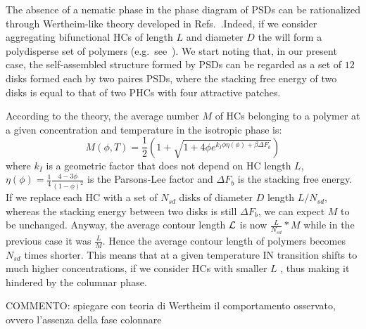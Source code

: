 \documentclass[aip,jcp, amsmath, amssymb, reprint]{revtex4-1}
\begin{document}
The absence of a nematic phase in the phase diagram of PSDs can be rationalized through Wertheim-like
theory developed in Refs.~\cite{Macromol12}.Indeed, if we consider aggregating bifunctional HCs of 
length $L$ and diameter $D$ the will form a polydisperse set of polymers (e.g.~see~\cite{DeMichele12}).
We start noting that, in our present case, the self-assembled structure formed by PSDs can be regarded 
as a set of $12$ disks formed each by two paires PSDs, where the stacking free energy of two disks is equal to 
that of two PHCs with four attractive patches.

According to the theory, the average number $M$ of HCs belonging to a polymer at a given concentration 
and temperature in the isotropic phase is:
\begin{equation}
M(\phi, T) = \frac{1}{2}\left( 1 + \sqrt{1 + 4 \phi e^{k_I \phi \eta(\phi)+\beta {\Delta F}_b}} \right) 
\end{equation}
where $k_I$ is a geometric factor that does not depend on HC length $L$, 
$\eta(\phi) = \frac{1}{4} \frac{4-3\phi}{{(1-\phi)}^2}$ is the Parsons-Lee factor
and ${\Delta F}_b$ is the stacking free energy.
If we replace each HC with a set of $N_{sd}$ disks of diameter $D$ length $L/N_{sd}$, whereas the stacking energy between two 
disks is still ${\Delta F}_b$, we can expect $M$ to be unchanged. Anyway, the average contour length ${\cal L}$
is now $\frac{L}{N_{sd}}*M$ while in the previous case it was $\frac{L}{M}$.
Hence the average contour length of polymers becomes $N_{sd}$ times shorter. 
This means that at a given temperature IN transition shifts to much higher concentrations, if we consider HCs with smaller $L$
, thus making it hindered by the columnar phase.


{\color{green}COMMENTO: spiegare con teoria di Wertheim il comportamento osservato, ovvero
l'assenza della fase colonnare}


\end{document}
